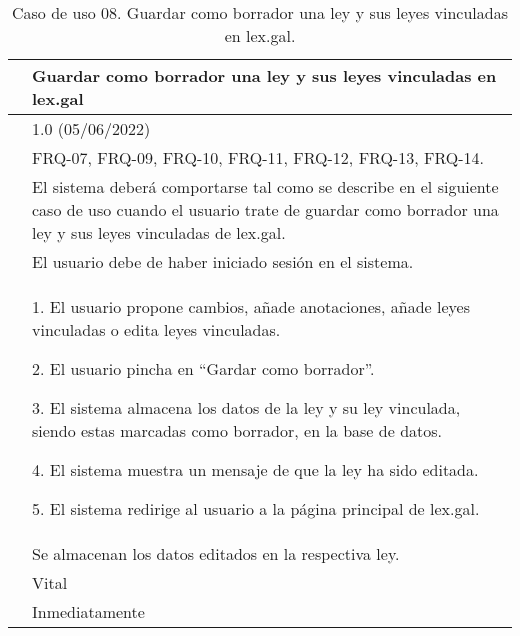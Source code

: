 \begin{table}[H]
\begin{center}
\begin{tabular}{|p{3cm}|p{10cm}|} \hline
\centering {\bf UC-08} & Guardar como borrador una ley y sus leyes vinculadas en lex.gal  \\ \hline\hline
\centering {\bf Versión} & 1.0 (05/06/2022) \\ \hline
\centering {\bf Dependencias} & FRQ-07, FRQ-09, FRQ-10, FRQ-11, FRQ-12, FRQ-13, FRQ-14. \\ \hline
\centering {\bf Descripción} &  El sistema deberá comportarse tal como se describe en el siguiente caso de uso cuando el usuario trate de guardar como borrador una ley y sus leyes vinculadas de lex.gal. \\ \hline
\centering {\bf Precondición} &  El usuario debe de haber iniciado sesión en el sistema. \\ \hline
\centering {\bf Secuencia normal} &  
1. El usuario propone cambios, añade anotaciones, añade leyes vinculadas o edita leyes vinculadas.

2. El usuario pincha en ``Gardar como borrador''.

3. El sistema almacena los datos de la ley y su ley vinculada, siendo estas marcadas como borrador, en la base de datos.

4. El sistema muestra un mensaje de que la ley ha sido editada.

5. El sistema redirige al usuario a la página principal de lex.gal.
\\ \hline
\centering {\bf Postcondición} &  Se almacenan los datos editados en la respectiva ley. \\ \hline
\centering {\bf Importancia} & Vital \\ \hline
\centering {\bf Urgencia} & Inmediatamente \\ \hline
\end{tabular}
\caption{Caso de uso 08. Guardar como borrador una ley y sus leyes vinculadas en lex.gal.}
\label{enlaceUC8}
\end{center}
\end{table}

